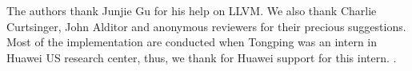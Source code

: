 The authors thank Junjie Gu for his help on LLVM. 
We also thank Charlie Curtsinger, John Alditor and anonymous reviewers for their precious suggestions. Most of the implementation are conducted when Tongping was an intern in Huawei US research center, thus, we thank for Huawei support for this intern. .  
